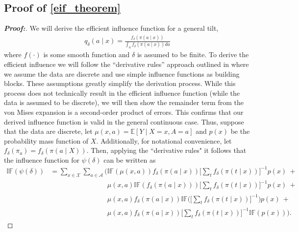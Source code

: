 \documentclass[11pt,twoside]{article}
\theoremstyle{definition}
\theoremstyle{remark}
\begin{document}
\subsection{Proof of \texorpdfstring{\cref{eif_theorem}}{Proposition 1}} \label{eif_theorem_proof}
\begin{proof}[\textbf{Proof:}] We will derive the efficient influence function  for a general tilt,
\begin{align*}
    q_{\delta}(a \mid x) = \frac{f_\delta(\pi(a \mid x))}{\int_a f_\delta(\pi(a \mid x)) da }
\end{align*}
where $f(\cdot)$ is some smooth function and $\delta$ is assumed to be finite. To derive the efficient influence we will follow the ``derivative rules'' approach outlined in \cite{kennedy2023semiparametric} where we assume the data are discrete and use simple influence functions as building blocks. These assumptions greatly simplify the derivation process. While this process does not technically result in the efficient influence function (while the data is assumed to be discrete), we will then show the remainder term from the von Mises expansion is a second-order product of errors. This confirms that our derived influence function is valid in the general continuous case. Thus, suppose that the data are discrete, let $\mu(x, a) = \mathbb{E}[Y \mid X=x, A=a]$ and $p(x)$ be the probability mass function of $X$. Additionally, for notational convenience, let $f_\delta(\pi_a) = f_\delta(\pi(a \mid X))$. Then, applying the ``derivative rules" it follows that the influence function for $\psi(\delta)$ can be written as
\begin{align*}
    \mathbb{IF}(\psi(\delta)) &= \sum_{x \in \mathcal{X}} \sum_{a \in \mathcal{A}} \Bigg( \mathbb{IF}(\mu(x, a)) f_\delta(\pi(a \mid x)) \Big[\sum_t f_\delta(\pi(t \mid x)) \Big]^{-1} p(x)  \: + \tag{$i$}\\
    &\phantom{{}={\sum_{x \in \mathcal{X}} \sum_{a \in \mathcal{A}} \Bigg(}} \mu(x, a) \mathbb{IF}(f_\delta(\pi(a \mid x))) \Big[\sum_t f_\delta(\pi(t \mid x)) \Big]^{-1} p(x) \: + \tag{$ii$}\\
    &\phantom{{}={\sum_{x \in \mathcal{X}} \sum_{a \in \mathcal{A}} \Bigg(}} \mu(x, a) f_\delta(\pi(a \mid x))  \mathbb{IF}\Big(\Big[\sum_t f_\delta(\pi(t \mid x)) \Big]^{-1}\Big) p(x) \: + \tag{$iii$}\\
    &\phantom{{}={\sum_{x \in \mathcal{X}} \sum_{a \in \mathcal{A}} \Bigg(}} \mu(x, a) f_\delta(\pi(a \mid x)) \Big[\sum_t f_\delta(\pi(t \mid x)) \Big]^{-1} \mathbb{IF}(p(x)) \Bigg). \tag{$iv$}

\end{align*}
\end{proof}
\end{document}
